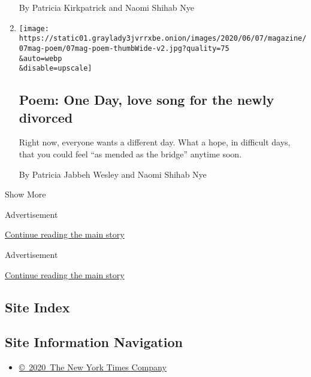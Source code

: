 \begin{enumerate}
  By Patricia Kirkpatrick and Naomi Shihab Nye
\item
  \href{/2020/06/04/magazine/poem-one-day-love-song-for-the-newly-divorced.html}{}

  \texttt{[image: https://static01.graylady3jvrrxbe.onion/images/2020/06/07/magazine/07mag-poem/07mag-poem-thumbWide-v2.jpg?quality=75\\\&auto=webp\\\&disable=upscale]}

  \hypertarget{poem-one-day-love-song-for-the-newly-divorced}{%
  \subsection{Poem: One Day, love song for the newly
  divorced}\label{poem-one-day-love-song-for-the-newly-divorced}}

  Right now, everyone wants a different day. What a hope, in difficult
  days, that you could feel ``as mended as the bridge'' anytime soon.

  By Patricia Jabbeh Wesley and Naomi Shihab Nye
\end{enumerate}

Show More

Advertisement

\protect\hyperlink{after-mid1}{Continue reading the main story}

Advertisement

\protect\hyperlink{after-mktg}{Continue reading the main story}

\hypertarget{site-index}{%
\subsection{Site Index}\label{site-index}}

\hypertarget{site-information-navigation}{%
\subsection{Site Information
Navigation}\label{site-information-navigation}}

\begin{itemize}
\tightlist
\item
  \href{https://help.nytimes3xbfgragh.onion/hc/en-us/articles/115014792127-Copyright-notice}{©~2020~The
  New York Times Company}
\end{itemize}

